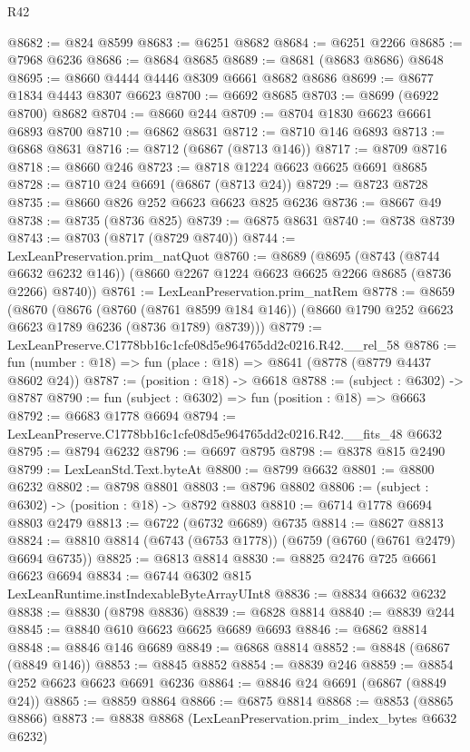 \begin{lexlean}{R42}
\begin{coremodule}
{@8682 := @824 @8599
@8683 := @6251 @8682
@8684 := @6251 @2266
@8685 := @7968 @6236
@8686 := @8684 @8685
@8689 := @8681 (@8683 @8686) @8648
@8695 := @8660 @4444 @4446 @8309 @6661 @8682 @8686
@8699 := @8677 @1834 @4443 @8307 @6623
@8700 := @6692 @8685
@8703 := @8699 (@6922 @8700) @8682
@8704 := @8660 @244
@8709 := @8704 @1830 @6623 @6661 @6893 @8700
@8710 := @6862 @8631
@8712 := @8710 @146 @6893
@8713 := @6868 @8631
@8716 := @8712 (@6867 (@8713 @146))
@8717 := @8709 @8716
@8718 := @8660 @246
@8723 := @8718 @1224 @6623 @6625 @6691 @8685
@8728 := @8710 @24 @6691 (@6867 (@8713 @24))
@8729 := @8723 @8728
@8735 := @8660 @826 @252 @6623 @6623 @825 @6236
@8736 := @8667 @49
@8738 := @8735 (@8736 @825)
@8739 := @6875 @8631
@8740 := @8738 @8739
@8743 := @8703 (@8717 (@8729 @8740))
@8744 := LexLeanPreservation.prim_natQuot
@8760 := @8689
    (@8695
      (@8743 (@8744 @6632 @6232 @146))
      (@8660 @2267 @1224 @6623 @6625 @2266 @8685 (@8736 @2266) @8740))
@8761 := LexLeanPreservation.prim_natRem
@8778 := @8659
    (@8670
      (@8676
        (@8760 (@8761 @8599 @184 @146))
        (@8660 @1790 @252 @6623 @6623 @1789 @6236 (@8736 @1789) @8739)))
@8779 := LexLeanPreserve.C1778bb16c1cfe08d5e964765dd2c0216.R42.__rel_58
@8786 := fun (number : @18) => fun (place : @18) => @8641 (@8778 (@8779 @4437 @8602 @24))
@8787 := (position : @18) -> @6618
@8788 := (subject : @6302) -> @8787
@8790 := fun (subject : @6302) => fun (position : @18) => @6663
@8792 := @6683 @1778 @6694
@8794 := LexLeanPreserve.C1778bb16c1cfe08d5e964765dd2c0216.R42.__fits_48 @6632
@8795 := @8794 @6232
@8796 := @6697 @8795
@8798 := @8378 @815 @2490
@8799 := LexLeanStd.Text.byteAt
@8800 := @8799 @6632
@8801 := @8800 @6232
@8802 := @8798 @8801
@8803 := @8796 @8802
@8806 := (subject : @6302) -> (position : @18) -> @8792 @8803
@8810 := @6714 @1778 @6694 @8803 @2479
@8813 := @6722 (@6732 @6689) @6735
@8814 := @8627 @8813
@8824 := @8810 @8814 (@6743 (@6753 @1778)) (@6759 (@6760 (@6761 @2479) @6694 @6735))
@8825 := @6813 @8814
@8830 := @8825 @2476 @725 @6661 @6623 @6694
@8834 := @6744 @6302 @815 LexLeanRuntime.instIndexableByteArrayUInt8
@8836 := @8834 @6632 @6232
@8838 := @8830 (@8798 @8836)
@8839 := @6828 @8814
@8840 := @8839 @244
@8845 := @8840 @610 @6623 @6625 @6689 @6693
@8846 := @6862 @8814
@8848 := @8846 @146 @6689
@8849 := @6868 @8814
@8852 := @8848 (@6867 (@8849 @146))
@8853 := @8845 @8852
@8854 := @8839 @246
@8859 := @8854 @252 @6623 @6623 @6691 @6236
@8864 := @8846 @24 @6691 (@6867 (@8849 @24))
@8865 := @8859 @8864
@8866 := @6875 @8814
@8868 := @8853 (@8865 @8866)
@8873 := @8838 @8868 (LexLeanPreservation.prim_index_bytes @6632 @6232)
}
\end{coremodule}
\end{lexlean}
